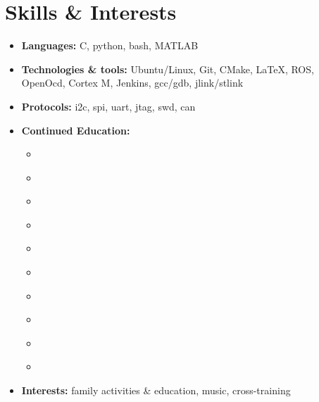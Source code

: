 \documentclass[letterpaper,11pt]{article}
\def\vspaceAfterBullets{3.5pt} %
\def\bulletIndent{20pt} %
\newcommand{\bulletItem}[1]{
  \item\small{
    {#1}
  }
}
\newcommand{\sectionListStart}{\begin{itemize}[leftmargin=0pt, label={}]}
\newcommand{\sectionListEnd}{\end{itemize}}
\newcommand{\outerBulletListStart}{\begin{itemize}[leftmargin=\bulletIndent]}
\newcommand{\outerBulletListEnd}{\end{itemize}\vspace{\vspaceAfterBullets}}
\newcommand{\bref}[2]{\href{#1}{\color{blue}{#2}}}
\begin{document}
\section{Skills \& Interests}
\sectionListStart
\bulletItem{\textbf{Languages:}{ C, python, bash, MATLAB}}
\vspace{\vspaceAfterBullets}
\bulletItem{\textbf{Technologies \& tools:}{ Ubuntu/Linux, Git, CMake, \LaTeX, ROS, OpenOcd, Cortex M, Jenkins, gcc/gdb, jlink/stlink}}
\vspace{\vspaceAfterBullets}
\bulletItem{\textbf{Protocols:}{ i2c, spi, uart, jtag, swd, can}}
\vspace{\vspaceAfterBullets}
\newpage
\bulletItem{\textbf{Continued Education:}}
\outerBulletListStart
\bulletItem{\bref{https://www.udemy.com/course/mastering-rtos-hands-on-with-freertos-arduino-and-stm32fx/}{Mastering RTOS: Hands on FreeRTOS and STM32Fx with Debugging}}
\bulletItem{\bref{https://www.udemy.com/course/bash-mastery/?kw=Bash+Mastery\%3A+The+Complete+Guide+to+Bash+Shell+Scriptin&src=sac}{Bash Mastery: The Complete Guide to Bash Shell Scripting}}
\bulletItem{\bref{https://www.udemy.com/course/embedded-system-programming-on-arm-cortex-m3m4/}{Embedded Systems Programming on ARM Cortex-M3 M4 Processor}}
\bulletItem{\bref{https://www.udemy.com/course/microcontroller-programming-stm32-timers-pwm-can-bus-protocol/}{Mastering Microcontroller: Timers, PWM, CAN, Low Power (MCU2)}}
\bulletItem{\bref{https://www.udemy.com/course/embedded-linux-step-by-step-using-beaglebone/}{Embedded Linux Step by Step Using Beaglebone Black}}
\bulletItem{\bref{https://www.udemy.com/course/complete-python-bootcamp/}{The Complete Python Bootcamp From Zero to Hero in Python}}
\bulletItem{\bref{https://www.udemy.com/course/git-complete}{Git Complete: The definitive, step-by-step guide to Git}}
\bulletItem{\bref{https://www.udemy.com/course/mastering-microcontroller-with-peripheral-driver-development/?kw=Mastering+Microcontroller+and+Embedded+Driver+Development&src=sac}{Mastering Microcontroller and Embedded Driver Development}}
\bulletItem{\bref{https://www.udemy.com/course/stm32f4-arm-cortex-mx-custom-bootloader-development/?couponCode=25BBPMXINACTIVE}{STM32Fx Microcontroller Custom Bootloader Development}}
\bulletItem{\bref{https://www.udemy.com/course/microcontroller-embedded-c-programming/?kw=Microcontroller+Embedded+C+Programming\%3A+absolute+beginners&src=sac}{Microcontroller Embedded C Programming: Absolute Beginners}}


\outerBulletListEnd
\vspace{\vspaceAfterBullets}
\bulletItem{\textbf{Interests:}{ family activities \& education, music, cross-training}}
\sectionListEnd
\vspace{1em} %
\end{document}
